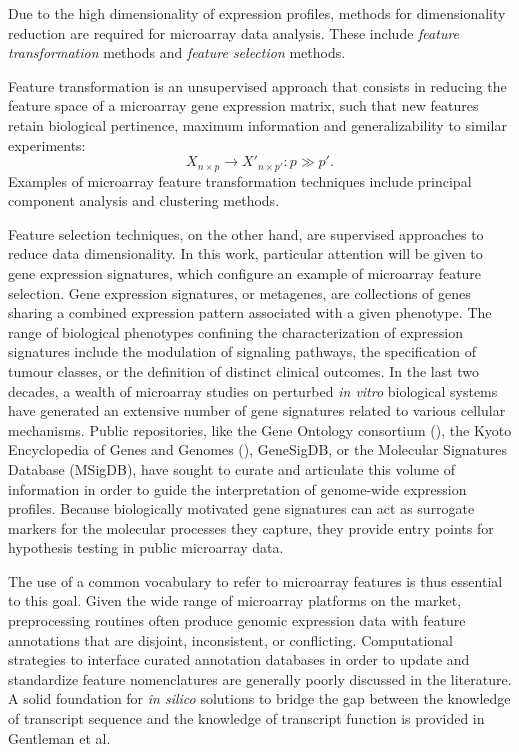 Due to the high dimensionality of expression profiles, methods for
dimensionality reduction are required for microarray data analysis.  These
include \emph{feature transformation} methods and \emph{feature selection}
methods.\cite{haibe-kains_identification_2009}

Feature transformation is an unsupervised approach that consists in reducing the
feature space of a microarray gene expression matrix, such that new features
retain biological pertinence, maximum information and generalizability to
similar experiments:
\begin{equation}
  \label{eq:feature-transformation}
  X_{n \times p} \to X'_{n \times p'} : p \gg p'.
\end{equation}
Examples of microarray feature transformation techniques include principal
component analysis and clustering methods.

Feature selection techniques, on the other hand, are supervised approaches to
reduce data dimensionality.  In this work, particular attention will be given to
gene expression signatures, which configure an example of microarray feature
selection.  Gene expression signatures, or metagenes, are collections of genes
sharing a combined expression pattern associated with a given phenotype.  The
range of biological phenotypes confining the characterization of expression
signatures include the modulation of signaling pathways,\cite{itadani_can_2008}
the specification of tumour classes,\cite{ramaswamy_multiclass_2001} or the
definition of distinct clinical outcomes.\cite{vant_veer_gene_2002} In the last
two decades, a wealth of microarray studies on perturbed \emph{in vitro}
biological systems have generated an extensive number of gene signatures related
to various cellular mechanisms.\cite{chibon_cancer_2013} Public repositories,
like the Gene Ontology consortium (),\cite{ashburner_gene_2000}
the Kyoto Encyclopedia of Genes and Genomes
(),\cite{kanehisa_kegg:_2000}
\mbox{GeneSigDB},\cite{culhane_genesigdb:_2012} or the Molecular Signatures
Database (\mbox{MSigDB}),\cite{subramanian_gene_2005} have sought to curate and
articulate this volume of information in order to guide the interpretation of
genome-wide expression profiles.  Because biologically motivated gene signatures
can act as surrogate markers for the molecular processes they capture, they
provide entry points for hypothesis testing in public microarray data.

The use of a common vocabulary to refer to microarray features is thus essential
to this goal.  Given the wide range of microarray platforms on the market,
preprocessing routines often produce genomic expression data with feature
annotations that are disjoint, inconsistent, or conflicting.  Computational
strategies to interface curated annotation databases in order to update and
standardize feature nomenclatures are generally poorly discussed in the
literature.  A solid foundation for \emph{in silico} solutions to bridge the gap
between the knowledge of transcript sequence and the knowledge of transcript
function is provided in Gentleman et al.\cite{gentleman_bioinformatics_2006}

